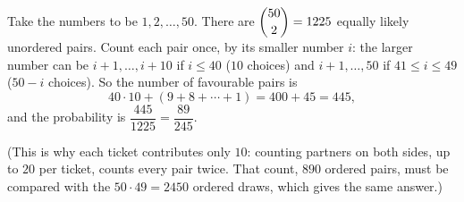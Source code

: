 Take the numbers to be $1,2,\dots,50$. There are $\dbinom{50}{2}=1225$ equally likely unordered pairs. Count each pair once, by its smaller number $i$: the larger number can be $i+1,\dots,i+10$ if $i\le40$ ($10$ choices) and $i+1,\dots,50$ if $41\le i\le49$ ($50-i$ choices). So the number of favourable pairs is
\[40\cdot10+(9+8+\cdots+1)=400+45=445,\]
and the probability is $\dfrac{445}{1225}=\boxed{\dfrac{89}{245}}$.

(This is why each ticket contributes only $10$: counting partners on both sides, up to $20$ per ticket, counts every pair twice. That count, $890$ ordered pairs, must be compared with the $50\cdot49=2450$ ordered draws, which gives the same answer.)
